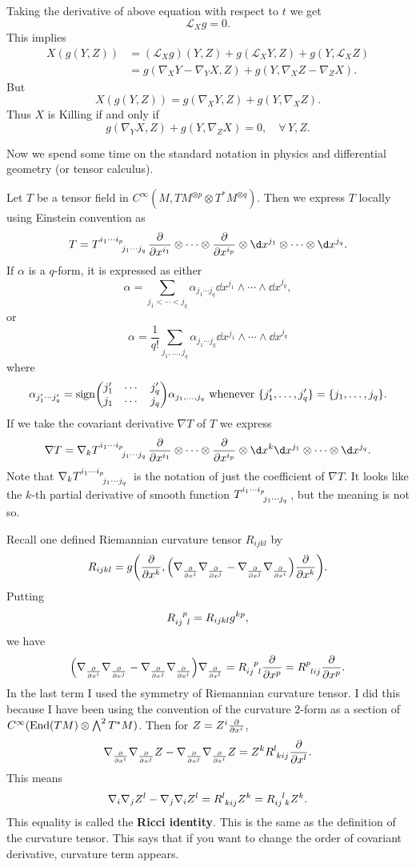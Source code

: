 \documentclass[12pt]{article}
\begin{document}
Taking the derivative of above equation with respect to \(t\) we get \[
  \mathcal{L}_X g=0
.\] This implies
\begin{align*}
  X(g(Y,Z))&=(\mathcal{L}_X g)(Y,Z)+g(\mathcal{L}_X Y,Z)+g(Y,\mathcal{L}_X Z) \\
  &=g(\nabla_X Y-\nabla_Y X,Z)+g(Y,\nabla_X Z-\nabla_Z X)
.\end{align*}
But \[
  X(g(Y,Z))=g(\nabla_X Y,Z)+g(Y,\nabla_X Z)
.\] Thus \(X\) is Killing if and only if \[
  g(\nabla_Y X,Z)+g(Y,\nabla_Z X)=0,\quad \forall\,Y,Z
.\]

Now we spend some time on the standard notation in physics and differential
geometry (or tensor calculus).

Let \(T\) be a tensor field in \(C^\infty(M,TM^{\otimes p}\otimes T^*M^{\otimes
q})\). Then we express \(T\) locally using Einstein convention as \[
  T=T\indices{^{i_1\cdots i_p}_{j_1\cdots j_q}}\pd{x^{i_1}}\otimes\cdots\otimes 
  \pd{x^{i_p}}\otimes \dd{x^{j_1}}\otimes \cdots \otimes \dd{x^{j_q}}
.\] If \(\alpha\) is a \(q\)-form, it is expressed as either \[
  \alpha=\sum_{j_1<\cdots <j_q}\alpha_{j_1\cdots j_q}\dd{x^{j_1}}\wedge \cdots 
  \wedge \dd{x^{j_q}},
\] or \[
  \alpha=\frac{1}{q!}\sum_{j_1,\ldots,j_q}\alpha_{j_1\cdots j_q}\dd{x^{j_1}}
  \wedge\cdots\wedge\dd{x^{j_q}}
\] where \[
  \alpha_{j_1'\cdots j'_q}=\sign\begin{pmatrix}
    j_1' & \cdots & j_q' \\
    j_1 & \cdots & j_q
  \end{pmatrix}\alpha_{j_1,\ldots,j_q}\text{ whenever }\{j_1',\ldots,j_q'\}
  =\{j_1,\ldots,j_q\}
.\] If we take the covariant derivative \(\nabla T\) of \(T\) we express \[
  \nabla T=\nabla_k T\indices{^{i_1\cdots i_p}_{j_1\cdots j_q}}\pd{x^{i_1}}
  \otimes\cdots\otimes\pd{x^{i_p}}\otimes \dd{x^k}\dd{x^{j_1}}\otimes
  \cdots \otimes \dd{x^{j_q}}
.\] Note that \(\nabla_k T\indices{^{i_1\cdots i_p}_{j_1\cdots j_q}}\) is 
the notation of just the coefficient of \(\nabla T\). It looks like the \(k\)-th
partial derivative of smooth function \(T\indices{^{i_1\cdots i_p}_{j_1\cdots
j_q}}\), but the meaning is not so.

Recall one defined Riemannian curvature tensor \(R_{ijkl}\) by \[
  R_{ijkl}=g\left(\pd{x^k},\left(\nabla_{\pd{x^i}}\nabla_{\pd{x^j}}-
  \nabla_{\pd{x^j}}\nabla_{\pd{x^i}}\right)\pd{x^k}\right)
.\] Putting \[
  R\indices{_{ij}^p_l}=R_{ijkl}g^{kp}
,\] we have \[
  \left(\nabla_{\pd{x^i}}\nabla_{\pd{x^j}}-\nabla_{\pd{x^j}}\nabla_{\pd{x^i}}
  \right)\nabla_{\pd{x^l}}=R\indices{_{ij}^p_l}\pd{x^p}=R\indices{^p_{lij}}
  \pd{x^p}
.\] In the last term I used the symmetry of Riemannian curvature tensor. I did
this because I have been using the convention of the curvature 2-form as a
section of \(C^\infty(\operatorname{End}(TM)\otimes \bigwedge^2T^*M)\). Then for
\(Z=Z^i \pdv{}{x^i}\), \[
  \nabla_{\pd{x^i}}\nabla_{\pd{x^j}}Z-\nabla_{\pd{x^j}}\nabla_{\pd{x^i}}Z
  =Z^k R\indices{^l_{kij}}\pd{x^l}
.\] This means \[
  \nabla_i \nabla_j Z^l-\nabla_j \nabla_i Z^l=R\indices{^l_{kij}}Z^k=
  R\indices{_{ij}^l_k}Z^k
.\] This equality is called the \textbf{Ricci identity}. This is the same as the
definition of the curvature tensor. This says that if you want to change the
order of covariant derivative, curvature term appears.
\end{document}
